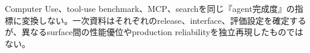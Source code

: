 \begin{claimboundary}
Computer Use、tool-use benchmark、MCP、searchを同じ『agent完成度』の指標に変換しない。一次資料はそれぞれのrelease、interface、評価設定を確定するが、異なるsurface間の性能優位やproduction reliabilityを独立再現したものではない。\autocite{src-9e4ef9c155b6}
\end{claimboundary}
